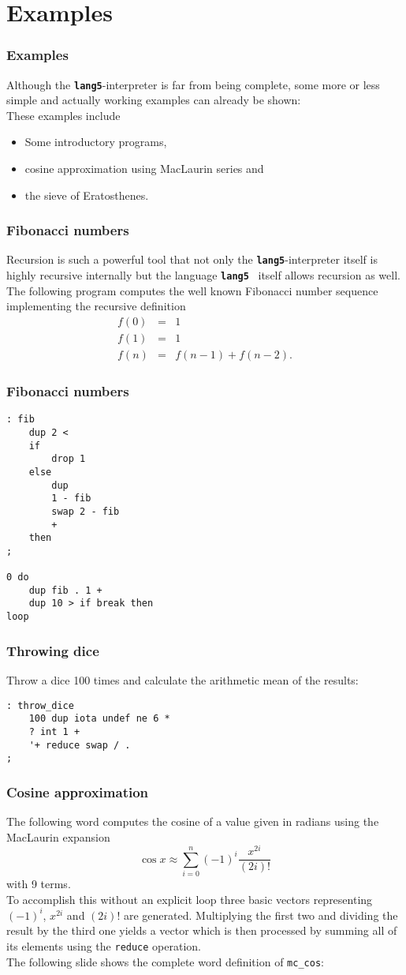 \documentclass{beamer}
\newcommand*{\NIX}{\vspace*{.3cm}\\}
\newcommand*{\F}{{\tt\bf lang5}}
\begin{document}
 \section{Examples}
  \begin{frame}
   \frametitle{Examples}
   Although the \F-interpreter is far from being complete, some more or less
   simple and actually working examples can already be shown:
   \NIX
   These examples include
   \begin{itemize}
    \item Some introductory programs, 
    \item cosine approximation using MacLaurin series and 
    \item the sieve of Eratosthenes.
   \end{itemize}
  \end{frame}
%
  \begin{frame}
   \frametitle{Fibonacci numbers}
   Recursion is such a powerful tool that not only the \F-interpreter itself
   is highly recursive internally but the language \F{ } itself allows 
   recursion as well.
   \NIX
   The following program computes the well known Fibonacci number sequence 
   implementing the recursive definition
   \begin{eqnarray}
    f(0)&=&1\nonumber\\
    f(1)&=&1\nonumber\\
    f(n)&=&f(n-1)+f(n-2).\nonumber
   \end{eqnarray}
  \end{frame}
%
  \begin{frame}[containsverbatim]
   \frametitle{Fibonacci numbers}
   \begin{verbatim}
: fib 
    dup 2 <
    if
        drop 1
    else
        dup
        1 - fib
        swap 2 - fib
        +
    then
;

0 do
    dup fib . 1 + 
    dup 10 > if break then
loop
   \end{verbatim}
  \end{frame}
%
  \begin{frame}[containsverbatim]
   \frametitle{Throwing dice}
   Throw a dice 100 times and calculate the arithmetic mean of the results:
   \begin{verbatim}
: throw_dice
    100 dup iota undef ne 6 * 
    ? int 1 + 
    '+ reduce swap / .
;
   \end{verbatim}
  \end{frame}
%
  \begin{frame}
   \frametitle{Cosine approximation}
   The following word computes the cosine of a value given in radians using 
   the MacLaurin expansion
   \begin{displaymath}
    \cos x\approx\sum\limits_{i=0}^n (-1)^i \frac{x^{2i}}{(2i)!}
   \end{displaymath}
   with 9 terms.
   \NIX
   To accomplish this without an explicit loop three basic vectors representing
   $(-1)^i$, $x^{2i}$ and $(2i)!$ are generated. Multiplying the first two and
   dividing the result by the third one yields a vector which is then processed
   by summing all of its elements using the {\tt reduce} operation.
   \NIX
   The following slide shows the complete word definition of {\tt mc\_cos}:
  \end{frame}
\end{document}
